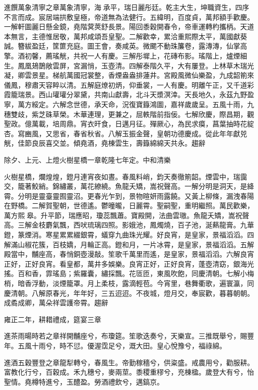 \begin{pinyinscope}
進饌萬象清寧之章萬象清寧，海承平，瑞日麗彤廷。乾主大生，坤職資生，四序不言而成。宸居端拱敷皇極，帝道無為法健行。五緯明，百度貞，萬邦額手歡慶。一解軒圖麗日懸金鏡，堯階蓂莢舒長景。陽回黍穀開春令，帝車運轉杓攜柄。天道本無言，主德惟居敬，萬邦咸頌吾皇聖。二解歡幸，累洽重熙際太平，萬國獻葵誠。簪紱盈廷，筐篚充庭。圖王會，奏咸英。微颸不動珠簾卷，露漙漙，仙掌高擎。酒初馨，薦瑤觥，共祝一人有慶。三解彤墀上，花磚布影。瑤階上，爐煙細生。鳳凰鳷鵲敞雲屏，宮漏悄，玉壺清。四解泰階久平，大有屢登。上林草木瑞光凝，卿雲景星。梯航萬國冠裳整，香煙盎盎排蓮井。宮殿風微仙樂盈，九成韶箾來儀鳳，穆肅天容睟以清。五解庭燎初炳，仰垂裳，一人有慶。明離午正，又千道彩霞籠瑞景。西山瓘瓘分翠黛，共南山獻壽，北斗天漿溟涬。天長地久，永茲九野盈寧，萬方綏定。六解念世德，承天命，況復寶籙鴻圖，嘉祥歲歲呈。五風十雨，九穗雙歧，紫芝硃草榮。木華連理，更兼之，屈軼階前指佞。七解欣慶，際昌期，觀聖政。億萬載，培周鼎。宵衣旰食，日邁月征。殫厥心，為民求瘼，菖葉抽時花綻杏。寫豳風，又思省，春省秋省。八解玉振金聲，皇朝功德慶成。從此年年獻兕觥，佳節良辰喜交並。傾堯酒，堯棟雲生，壽籙綿綿天共永。趨辭

除夕、上元、上燈火樹星橋一章乾隆七年定。中和清樂

火樹星橋，爛煌煌，鐙月連宵夜如晝。春風料峭，鈞天奏徹箾韶。煙雲中，瑞靄交，籠著鮫綃。錦繡叢，萬花繚繞。魚龍夭矯，嵩祝聲高。一解分明是洞天，是絳霄。分明是靈臺靈囿靈沼。更春光乍到，景物暄妍雨露饒。又黃上柳條，漏洩春陽在野橋。二解賀聖朝，世德遙。鬱曈曨，日麗霄。聖嗣聖，重明繼照。萬民歡樂，萬方熙皋。升平節，瑞應昭，瓊蕊飄蕭。寶殿開，法曲雲璈。魚龍夭矯，嵩祝聲高。三解金枝麝氣飄，西吠琉璃四照。影娥池，鳳燭燒，百子池，涎爇龍膏。九華鐙，篆煙消。寒星累累綴銀霄，蟻穿九曲珠光耀。好良宵，是皇家，景福滔滔。四解滿山椒花簇，百枝嬌，月輪正高。鐙和月，一片冰霄，是皇家，景福滔滔。五解殿當中，黼座高，春悄銅壺漫敲。笙歌千萬里而遙，是皇家，景福滔滔。六解良宵正好，正好良宵。看皇都，萬井多娛樂。良宵正好，正好良宵，蓬壺清窈，銀海光搖。百和香，霏瑤島；紫羅囊，繡採飄。花匼匝，東風吹飽，同慶清朝。七解小梅梢，暗香浮動，淡煙籠罩。月上柔枝，露滴輕苞。今宵里，巷舞衢歌，遍寰瀛，同慶清朝。八解原春光，年年好，三五迢迢。不夜城，燈月交，奉宸歡，暮暮朝朝。成矞成卿，萬朵祥雲護帝霄。趨辭

雍正二年，耕耤禮成，筵宴三章

進茶雨暘時若之章祥開黼座兮，布瓊筵。笙歌迭奏兮，天樂宣。三推既舉兮，賜豐年。五風十雨兮，時不愆。優渥霑足兮，溉大田。皇心悅豫兮，福祿綿。

進酒五穀豐登之章龍犁轉兮，春風生。帝勤稼穡兮，供粢盛。戒農用兮，勸服耕。富教化行兮，百穀成。禾九穗兮，麥兩莖。黍稷重穋兮，充棟楹。歲登大有兮，怡聖情。堯樽特進兮，玉醴盈。勞酒禮飲兮，邁鎬京。


\end{pinyinscope}
